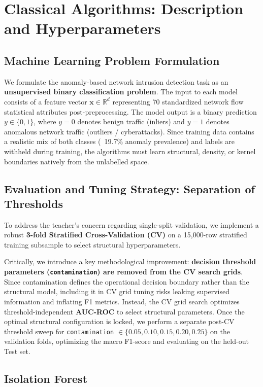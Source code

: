 \section{Classical Algorithms: Description and Hyperparameters}

\subsection{Machine Learning Problem Formulation}
We formulate the anomaly-based network intrusion detection task as an \textbf{unsupervised binary classification problem}. The input to each model consists of a feature vector $\mathbf{x} \in \mathbb{R}^{d}$ representing 70 standardized network flow statistical attributes post-preprocessing. The model output is a binary prediction $y \in \{0, 1\}$, where $y=0$ denotes benign traffic (inliers) and $y=1$ denotes anomalous network traffic (outliers / cyberattacks). Since training data contains a realistic mix of both classes (~19.7\% anomaly prevalence) and labels are withheld during training, the algorithms must learn structural, density, or kernel boundaries natively from the unlabelled space.

\subsection{Evaluation and Tuning Strategy: Separation of Thresholds}
To address the teacher's concern regarding single-split validation, we implement a robust \textbf{3-fold Stratified Cross-Validation (CV)} on a 15,000-row stratified training subsample to select structural hyperparameters. 

Critically, we introduce a key methodological improvement: \textbf{decision threshold parameters (\texttt{contamination}) are removed from the CV search grids}. Since contamination defines the operational decision boundary rather than the structural model, including it in CV grid tuning risks leaking supervised information and inflating F1 metrics. Instead, the CV grid search optimizes threshold-independent \textbf{AUC-ROC} to select structural parameters. Once the optimal structural configuration is locked, we perform a separate post-CV threshold sweep for \texttt{contamination} $\in \{0.05, 0.10, 0.15, 0.20, 0.25\}$ on the validation folds, optimizing the macro F1-score and evaluating on the held-out Test set.

\subsection{Isolation Forest}

